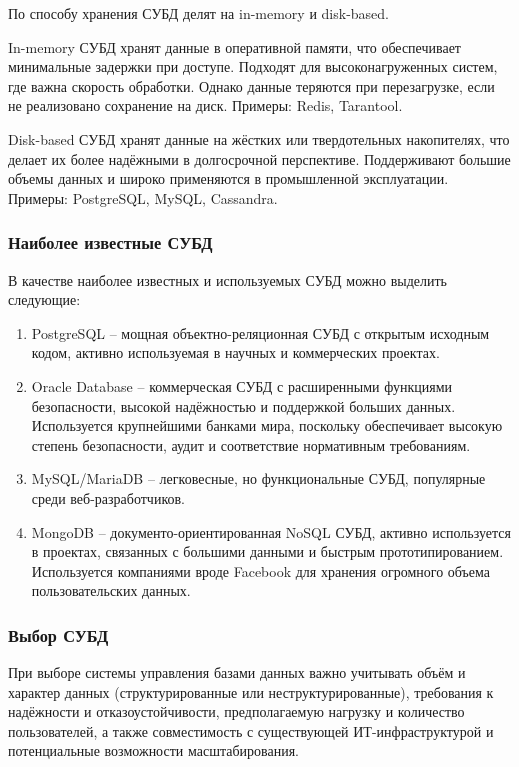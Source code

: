 По способу хранения СУБД делят на in-memory и disk-based. 

In-memory СУБД хранят данные в оперативной памяти, что обеспечивает минимальные задержки при доступе. Подходят для высоконагруженных систем, где важна скорость обработки. Однако данные теряются при перезагрузке, если не реализовано сохранение на диск. Примеры: Redis, Tarantool.

Disk-based СУБД хранят данные на жёстких или твердотельных накопителях, что делает их более надёжными в долгосрочной перспективе. Поддерживают большие объемы данных и широко применяются в промышленной эксплуатации. Примеры: PostgreSQL, MySQL, Cassandra.

\subsubsection{Наиболее известные СУБД}

В качестве наиболее известных и используемых СУБД можно выделить следующие:

\begin{enumerate}
	\item PostgreSQL -- мощная объектно-реляционная СУБД с открытым исходным кодом, активно используемая в научных и коммерческих проектах.
	\item Oracle Database -- коммерческая СУБД с расширенными функциями безопасности, высокой надёжностью и поддержкой больших данных. Используется крупнейшими банками мира, поскольку обеспечивает высокую степень безопасности, аудит и соответствие нормативным требованиям.
	\item MySQL/MariaDB -- легковесные, но функциональные СУБД, популярные среди веб-разработчиков.
	\item MongoDB -- документо-ориентированная NoSQL СУБД, активно используется в проектах, связанных с большими данными и быстрым прототипированием. Используется компаниями вроде Facebook для хранения огромного объема пользовательских данных.
\end{enumerate}

\subsubsection{Выбор СУБД}

При выборе системы управления базами данных важно учитывать объём и характер данных (структурированные или неструктурированные), требования к надёжности и отказоустойчивости, предполагаемую нагрузку и количество пользователей, а также совместимость с существующей ИТ-инфраструктурой и потенциальные возможности масштабирования. 

